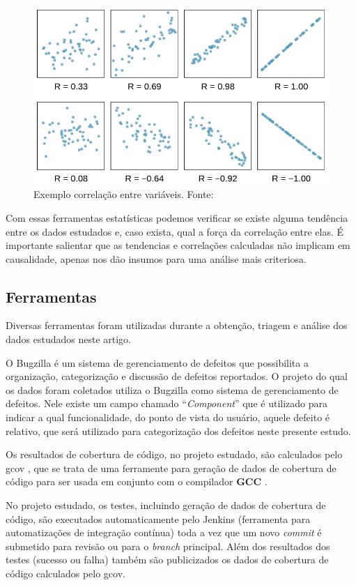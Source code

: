\documentclass[11.5pt]{article}
\begin{document}
\begin{figure}[ht]
    \centering
    \includegraphics[width=.7\textwidth]{correlation_example.png}
    \caption{Exemplo correlação entre variáveis. Fonte: \cite{openIntroStat}}
    \label{fig:correlation_example}
\end{figure}

Com essas ferramentas estatísticas podemos verificar se existe alguma tendência entre os dados
estudados e, caso exista, qual a força da correlação entre elas.
É importante salientar que as tendencias e correlações calculadas não implicam em causalidade,
apenas nos dão insumos para uma análise mais criteriosa.


\subsection{Ferramentas}

Diversas ferramentas foram utilizadas durante a obtenção, triagem e análise dos dados estudados
neste artigo.

O Bugzilla \cite{bugzilla} é um sistema de gerenciamento de defeitos que possibilita a organização,
categorização e discussão de defeitos reportados.
O projeto do qual os dados foram coletados utiliza o Bugzilla como sistema de gerenciamento de
defeitos. Nele existe um campo chamado ``\textit{Component}'' que é utilizado para indicar a qual
funcionalidade, do ponto de vista do usuário, aquele defeito é relativo, que será utilizado para
categorização dos defeitos neste presente estudo.

Os resultados de cobertura de código, no projeto estudado, são calculados pelo gcov \cite{gcov}, que
se trata de uma ferramente para geração de dados de cobertura de código para ser usada em conjunto
com o compilador \textbf{GCC} \cite{gcc}.

No projeto estudado, os testes, incluindo geração de dados de cobertura de código, são executados
automaticamente pelo Jenkins \cite{jenkins} (ferramenta para automatizações de integração contínua)
toda a vez que um novo \textit{commit} é submetido para revisão ou para o \textit{branch} principal.
Além dos resultados dos testes (sucesso ou falha) também são publicizados os dados de cobertura de
código calculados pelo gcov.
\end{document}
